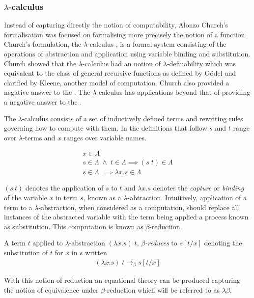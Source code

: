 \subsubsection{$\lambda$-calculus}
Instead of capturing directly the notion of computability, Alonzo Church's
formalisation was focused on formalising more precisely the notion of a
function.  Church's formulation, the $\lambda$-calculus \cite{church1932set}, is
a formal system consisting of the operations of abstraction and application
using variable binding and substitution. Church showed that the
$\lambda$-calculus had an notion of $\lambda$-definability
\cite{church1936unsolvable} which was equivalent to the class of general
recursive functions \cite{kleene1936general} as defined by G{\"o}del and
clarified by Kleene, another model of computation.  Church also provided a
negative answer to the \ent. The $\lambda$-calculus has applications beyond that
of providing a negative answer to the \ent.

The $\lambda$-calculus consists of a set of inductively defined terms and
rewriting rules governing how to compute with them. In the definitions that
follow $s$ and $t$ range over $\lambda$-terms and $x$ ranges over variable
names.

\begin{definition*}
    \begin{gather*}
        x \in \Lambda \\
        s \in \Lambda \; \land \; t \in \Lambda \implies (s \; t) \in \Lambda \\
        s \in \Lambda \; \implies \lambda x . s \in \Lambda
    \end{gather*}
\end{definition*}

$(s \: t)$ denotes the application of $s$ to $t$ and $\lambda x . s $ denotes
the \textit{capture} or \textit{binding} of the variable $x$ in term $s$, known
as a $\lambda$-abtraction. Intuitively, application of a term to a
$\lambda$-abstraction, when considered as a computation, should replace all
instances of the abstracted variable with the term being applied a process known
as substitution. This computation is known as $\beta$-reduction.


\begin{definition*} A term $t$ applied to
    $\lambda$-abstraction $(\lambda x . s) \; t$, $\beta$\textit{-reduces} to
    $s[t/x]$ denoting the substitution of $t$ for $x$ in $s$ written
    \begin{align*}
        (\lambda x . s) \; t \rightarrow_{\beta} s[t/x]
    \end{align*}
\end{definition*}
With this notion of reduction an equational theory can be produced capturing the
notion of equivalence under $\beta$-reduction which will be referred to as
$\lambda\beta$.

